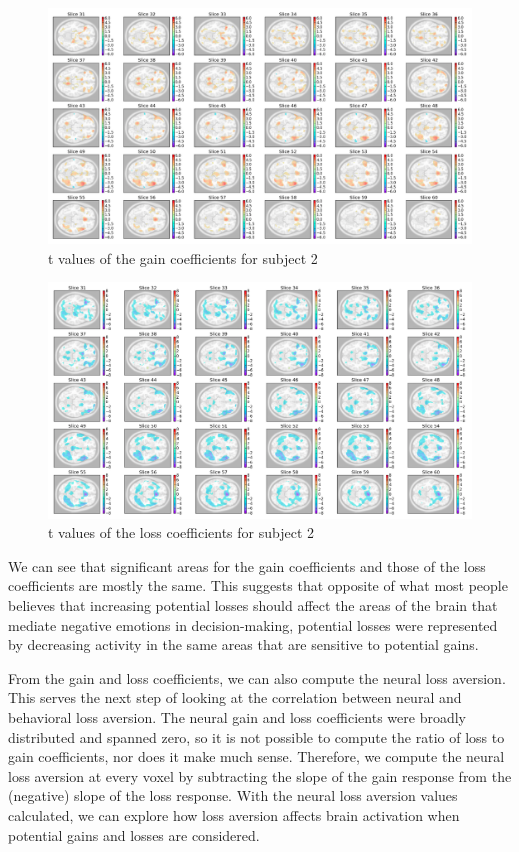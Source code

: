 \documentclass[11pt]{article}
\begin{document}
\begin{figure}[H]
    \centering
        \includegraphics[scale=0.4]{figures/Regression2/t_gain_standard_sub2.png}
    \caption{t values of the gain coefficients for subject 2}
\end{figure}

\begin{figure}[H]
    \centering
        \includegraphics[scale=0.4]{figures/Regression2/t_loss_standard_sub2.png}
    \caption{t values of the loss coefficients for subject 2}
\end{figure}

We can see that significant areas for the gain coefficients and those of the 
loss coefficients are mostly the same. This suggests that opposite of what 
most people believes that increasing potential losses should affect the areas 
of the brain that mediate negative emotions in decision-making, potential 
losses were represented by decreasing activity in the same areas that are 
sensitive to potential gains.

From the gain and loss coefficients, we can also compute the neural loss
aversion. This serves the next step of looking at the correlation between
neural and behavioral loss aversion. The neural gain and loss coefficients
were broadly distributed and spanned zero, so it is not possible to compute
the ratio of loss to gain coefficients, nor does it make much sense.
Therefore, we compute the neural loss aversion at every voxel by subtracting
the slope of the gain response from the (negative) slope of the loss response.
With the neural loss aversion values calculated, we can explore how loss
aversion affects brain activation when potential gains and losses are
considered.
\end{document}
